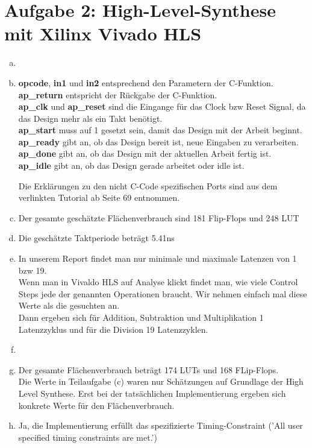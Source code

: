 \documentclass[a4paper]{scrartcl}
\begin{document}
\newpage
\section*{Aufgabe 2: High-Level-Synthese mit Xilinx Vivado HLS}

\begin{enumerate}[(a)]
	\item
	\item \textbf{opcode}, \textbf{in1} und \textbf{in2} entsprechend den Parametern der C-Funktion.\\
	\textbf{ap\_return} entspricht der Rückgabe der C-Funktion.\\
	\textbf{ap\_clk} und \textbf{ap\_reset} sind die Eingange für das Clock bzw Reset Signal, da das Design mehr als ein Takt benötigt.\\
	\textbf{ap\_start} muss auf 1 gesetzt sein, damit das Design mit der Arbeit beginnt.\\
	\textbf{ap\_ready} gibt an, ob das Design bereit ist, neue Eingaben zu verarbeiten.\\
	\textbf{ap\_done} gibt an, ob das Design mit der aktuellen Arbeit fertig ist.\\
	\textbf{ap\_idle} gibt an, ob das Design gerade arbeitet oder idle ist.
	
	Die Erklärungen zu den nicht C-Code spezifischen Ports sind aus dem verlinkten Tutorial ab Seite 69 entnommen.
	\item Der gesamte geschätzte Flächenverbrauch sind 181 Flip-Flops und 248 LUT
	\item Die geschätzte Taktperiode beträgt 5.41ns
	\item In unserem Report findet man nur minimale und maximale Latenzen von 1 bzw 19.\\
	Wenn man in Vivaldo HLS auf Analyse klickt findet man, wie viele Control Steps jede der genannten Operationen braucht. Wir nehmen einfach mal diese Werte als die gesuchten an.\\
	Dann ergeben sich für Addition, Subtraktion und Multiplikation 1 Latenzzyklus und für die Division 19 Latenzzyklen.
	
	\item	
	
	\item Der gesamte Flächenverbrauch beträgt 174 LUTs und 168 FLip-Flops.\\
	Die Werte in Teilaufgabe (c) waren nur Schätzungen auf Grundlage der High Level Synthese. Erst bei der tatsächlichen Implementierung ergeben sich konkrete Werte für den Flächenverbrauch. 
	\item Ja, die Implementierung erfüllt das spezifizierte Timing-Constraint ('All user specified timing constraints are met.')\\
	

\end{enumerate}
\end{document}
